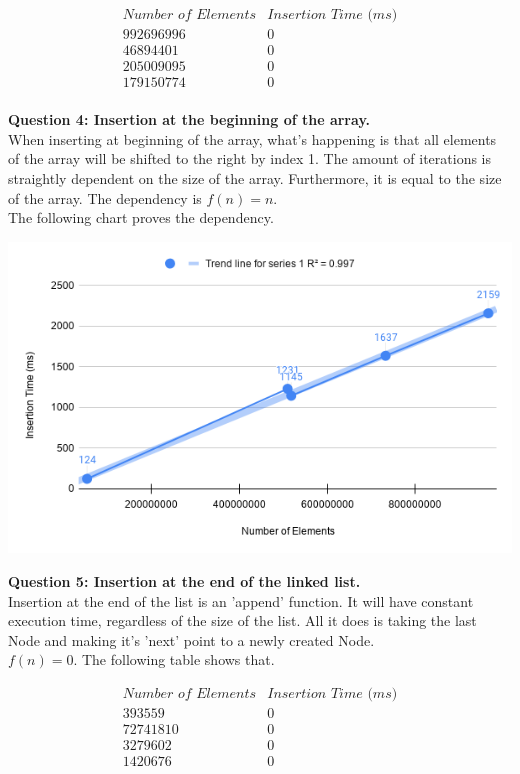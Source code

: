 \documentclass[11pt]{article}
\begin{document}
\begin{displaymath}
\begin{array}{|c|c|}
\textit{Number of Elements} & \textit{Insertion Time (ms)}\\
\hline
 992696996 & 0\\
 46894401 & 0\\
 205009095 & 0\\
 179150774 & 0\\
\end{array}
\end{displaymath}

\newpage
\textbf{Question 4: Insertion at the beginning of the array.}
\\When inserting at beginning of the array, what's happening is that all elements of the array will be shifted to the right by index 1. The amount of iterations is straightly dependent on the size of the array. Furthermore, it is equal to the size of the array. The dependency is $f(n) = n$.
\\The following chart proves the dependency.

\includegraphics[width=\textwidth]{chart.png}

\newpage
\textbf{Question 5: Insertion at the end of the linked list.}
\\Insertion at the end of the list is an 'append' function. It will have constant execution time, regardless of the size of the list. All it does is taking the last Node and making it's 'next' point to a newly created Node.
\\$f(n) = 0$. The following table shows that.

\begin{displaymath}
\begin{array}{|c|c|}
\textit{Number of Elements} & \textit{Insertion Time (ms)}\\
\hline
 393559 & 0\\
 72741810 & 0\\
 3279602 & 0\\
 1420676 & 0\\
\end{array}
\end{displaymath}
\end{document}
